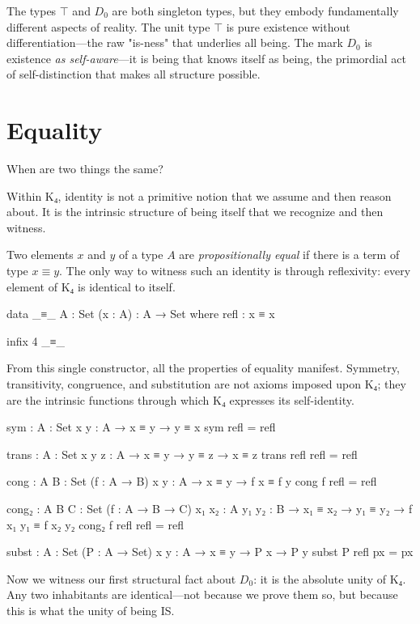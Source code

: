 \documentclass[11pt,a4paper]{book}
\begin{document}
The types $\top$ and $D_0$ are both singleton types, but they embody fundamentally 
different aspects of reality. The unit type $\top$ is pure existence without 
differentiation—the raw "is-ness" that underlies all being. The mark $D_0$ is 
existence \emph{as self-aware}—it is being that knows itself as being, the 
primordial act of self-distinction that makes all structure possible.

\chapter{Equality}

When are two things the same?

Within K₄, identity is not a primitive notion that we assume and then reason about. It is the intrinsic structure of being itself that we recognize and then witness.

Two elements $x$ and $y$ of a type $A$ are \emph{propositionally equal} if there is a term of type $x \equiv y$. The only way to witness such an identity is through reflexivity: every element of K₄ is identical to itself.

\begin{code}
data _≡_ {A : Set} (x : A) : A → Set where
  refl : x ≡ x

infix 4 _≡_
\end{code}

From this single constructor, all the properties of equality manifest. Symmetry, transitivity, congruence, and substitution are not axioms imposed upon K₄; they are the intrinsic functions through which K₄ expresses its self-identity.

\begin{code}
sym : {A : Set} {x y : A} → x ≡ y → y ≡ x
sym refl = refl

trans : {A : Set} {x y z : A} → x ≡ y → y ≡ z → x ≡ z
trans refl refl = refl

cong : {A B : Set} (f : A → B) {x y : A} → x ≡ y → f x ≡ f y
cong f refl = refl

cong₂ : {A B C : Set} (f : A → B → C) {x₁ x₂ : A} {y₁ y₂ : B} 
      → x₁ ≡ x₂ → y₁ ≡ y₂ → f x₁ y₁ ≡ f x₂ y₂
cong₂ f refl refl = refl

subst : {A : Set} (P : A → Set) {x y : A} → x ≡ y → P x → P y
subst P refl px = px
\end{code}

Now we witness our first structural fact about $D_0$: it is the absolute unity of K₄. Any two inhabitants are identical—not because we prove them so, but because this is what the unity of being IS.
\end{document}
